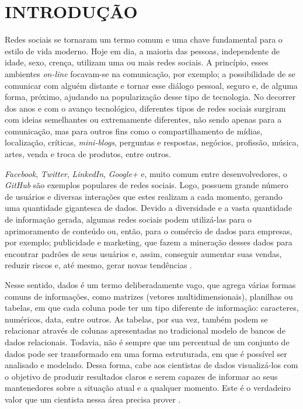 \chapter{INTRODUÇÃO}\label{ch:introducao}

Redes sociais se tornaram um termo comum e uma chave fundamental para o estilo de vida moderno. Hoje em dia, a maioria das pessoas, independente de idade, sexo, crença, utilizam uma ou mais redes sociais. A princípio, esses ambientes \textit{on-line} focavam-se na comunicação, por exemplo; a possibilidade de se comunicar com alguém distante e tornar esse diálogo pessoal, seguro e, de alguma forma, próximo, ajudando na popularização desse tipo de tecnologia. No decorrer dos anos e com o avanço tecnológico, diferentes tipos de redes sociais surgiram com ideias semelhantes ou extremamente diferentes, não sendo apenas para a comunicação, mas para outros fins como o compartilhamento de mídias, localização, críticas, \textit{mini-blogs}, perguntas e respostas, negócios, profissão, música, artes, venda e troca de produtos, entre outros. 

\textit{Facebook}, \textit{Twitter}, \textit{LinkedIn}, \textit{Google+} e, muito comum entre desenvolvedores, o \textit{GitHub} são exemplos populares de redes sociais. Logo, possuem grande número de usuários e diversas interações que estes realizam a cada momento, gerando uma quantidade gigantesca de dados. Devido a diversidade e a vasta quantidade de informação gerada, algumas redes sociais podem utilizá-las para o aprimoramento de conteúdo ou, então, para o comércio de dados para empresas, por exemplo; publicidade e marketing, que fazem a mineração desses dados para encontrar padrões de seus usuários e, assim, conseguir aumentar suas vendas, reduzir riscos e, até mesmo, gerar novas tendências \cite{mining-social-web}.

Nesse sentido, dados é um termo deliberadamente vago, que agrega várias formas comuns de informações, como matrizes (vetores multidimensionais), planilhas ou tabelas, em que cada coluna pode ter um tipo diferente de informação: caracteres, numéricos, data, entre outros. As tabelas, por sua vez, também podem se relacionar através de colunas apresentadas no tradicional modelo de bancos de dados relacionais. Todavia, não é sempre que um percentual de um conjunto de dados pode ser transformado em uma forma estruturada, em que é possível ser analisado e modelado. Dessa forma, cabe aos cientistas de dados visualizá-los com o objetivo de produzir resultados claros e serem capazes de informar ao seus mantenedores sobre a situação atual e a qualquer momento. Este é o verdadeiro valor que um cientista nessa área precisa prover \cite{han}.


